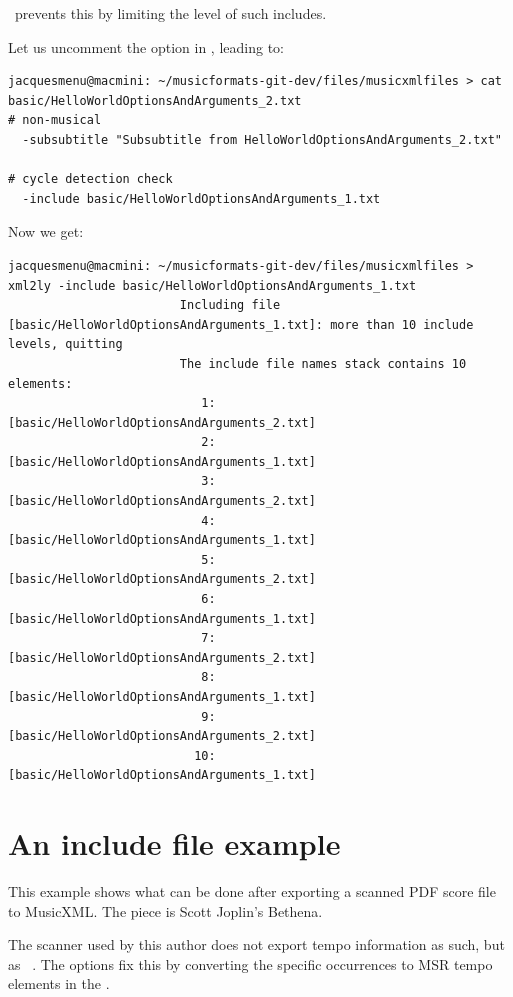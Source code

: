 \mf\ prevents this by limiting the level of such includes.

Let us uncomment the  option in , leading to:
\begin{lstlisting}[language=Terminal]
jacquesmenu@macmini: ~/musicformats-git-dev/files/musicxmlfiles > cat basic/HelloWorldOptionsAndArguments_2.txt
# non-musical
  -subsubtitle "Subsubtitle from HelloWorldOptionsAndArguments_2.txt"

# cycle detection check
  -include basic/HelloWorldOptionsAndArguments_1.txt
\end{lstlisting}

Now we get:
\begin{lstlisting}[language=Terminal]
jacquesmenu@macmini: ~/musicformats-git-dev/files/musicxmlfiles > xml2ly -include basic/HelloWorldOptionsAndArguments_1.txt
                        Including file [basic/HelloWorldOptionsAndArguments_1.txt]: more than 10 include levels, quitting
                        The include file names stack contains 10 elements:
                           1: [basic/HelloWorldOptionsAndArguments_2.txt]
                           2: [basic/HelloWorldOptionsAndArguments_1.txt]
                           3: [basic/HelloWorldOptionsAndArguments_2.txt]
                           4: [basic/HelloWorldOptionsAndArguments_1.txt]
                           5: [basic/HelloWorldOptionsAndArguments_2.txt]
                           6: [basic/HelloWorldOptionsAndArguments_1.txt]
                           7: [basic/HelloWorldOptionsAndArguments_2.txt]
                           8: [basic/HelloWorldOptionsAndArguments_1.txt]
                           9: [basic/HelloWorldOptionsAndArguments_2.txt]
                          10: [basic/HelloWorldOptionsAndArguments_1.txt]
\end{lstlisting}


\section{An include file example}

This example shows what can be done after exporting a scanned PDF score file to MusicXML. The piece is Scott Joplin's Bethena.

The scanner used by this author does not export tempo information as such, but as \mxml\ . The  options fix this by converting the specific occurrences to MSR tempo elements in the  \pass.

